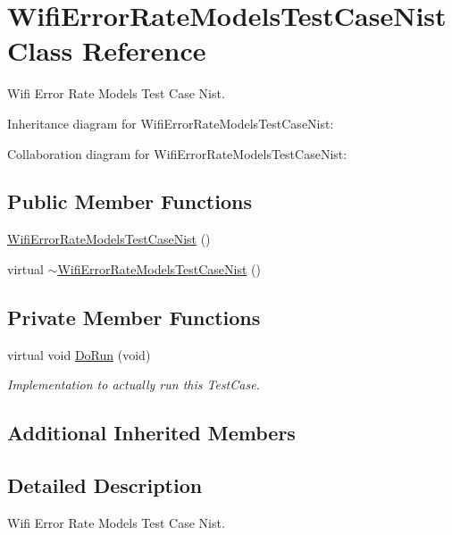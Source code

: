 \hypertarget{classWifiErrorRateModelsTestCaseNist}{}\section{Wifi\+Error\+Rate\+Models\+Test\+Case\+Nist Class Reference}
\label{classWifiErrorRateModelsTestCaseNist}


Wifi Error Rate Models Test Case Nist.  




Inheritance diagram for Wifi\+Error\+Rate\+Models\+Test\+Case\+Nist\+:


Collaboration diagram for Wifi\+Error\+Rate\+Models\+Test\+Case\+Nist\+:
\subsection*{Public Member Functions}
\begin{DoxyCompactItemize}
\item 
\hyperlink{classWifiErrorRateModelsTestCaseNist_aebf8c4856920355c080337f589f561e1}{Wifi\+Error\+Rate\+Models\+Test\+Case\+Nist} ()
\item 
virtual \hyperlink{classWifiErrorRateModelsTestCaseNist_a6bcb0cf3c77c274a68370a109a6ce4ad}{$\sim$\+Wifi\+Error\+Rate\+Models\+Test\+Case\+Nist} ()
\end{DoxyCompactItemize}
\subsection*{Private Member Functions}
\begin{DoxyCompactItemize}
\item 
virtual void \hyperlink{classWifiErrorRateModelsTestCaseNist_ad5b8a5a3be038338f6bcbe0d52331c90}{Do\+Run} (void)
\begin{DoxyCompactList}\small\item\em Implementation to actually run this Test\+Case. \end{DoxyCompactList}\end{DoxyCompactItemize}
\subsection*{Additional Inherited Members}


\subsection{Detailed Description}
Wifi Error Rate Models Test Case Nist. 

